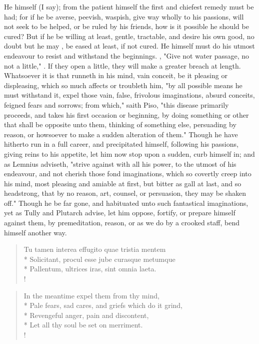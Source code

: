 {He himself (I say); from the patient himself the first and chiefest remedy must be had; for if he be averse, peevish, waspish, give way wholly to his passions, will not seek to be helped, or be ruled by his friends, how is it possible he should be cured? But if he be willing at least, gentle, tractable, and desire his own good, no doubt but he may , be eased at least, if not cured. He himself must do his utmost endeavour to resist and withstand the beginnings. , "Give not water passage, no not a little," . If they open a little, they will make a greater breach at length. Whatsoever it is that runneth in his mind, vain conceit, be it pleasing or displeasing, which so much affects or troubleth him, "by all possible means he must withstand it, expel those vain, false, frivolous imaginations, absurd conceits, feigned fears and sorrows; from which," saith Piso, "this disease primarily proceeds, and takes his first occasion or beginning, by doing something or other that shall be opposite unto them, thinking of something else, persuading by reason, or howsoever to make a sudden alteration of them." Though he have hitherto run in a full career, and precipitated himself, following his passions, giving reins to his appetite, let him now stop upon a sudden, curb himself in; and as Lemnius adviseth, "strive against with all his power, to the utmost of his endeavour, and not cherish those fond imaginations, which so covertly creep into his mind, most pleasing and amiable at first, but bitter as gall at last, and so headstrong, that by no reason, art, counsel, or persuasion, they may be shaken off." Though he be far gone, and habituated unto such fantastical imaginations, yet as Tully and Plutarch advise, let him oppose, fortify, or prepare himself against them, by premeditation, reason, or as we do by a crooked staff, bend himself another way.

\begin{latin}
\begin{verse}%
Tu tamen interea effugito quae tristia mentem\\*
Solicitant, procul esse jube curasque metumque\\*
Pallentum, ultrices iras, sint omnia laeta.\\!
\end{verse}%
\end{latin}%
\translationrule%
\begin{verse}%
In the meantime expel them from thy mind,\\*
Pale fears, sad cares, and griefs which do it grind,\\*
Revengeful anger, pain and discontent,\\*
Let all thy soul be set on merriment.\\!
\end{verse}%

}
